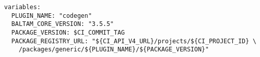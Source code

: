 
\begin{lstlisting}[language=none]
variables:
  PLUGIN_NAME: "codegen"
  BALTAM_CORE_VERSION: "3.5.5"
  PACKAGE_VERSION: $CI_COMMIT_TAG
  PACKAGE_REGISTRY_URL: "${CI_API_V4_URL}/projects/${CI_PROJECT_ID} \ 
    /packages/generic/${PLUGIN_NAME}/${PACKAGE_VERSION}"
\end{lstlisting}
